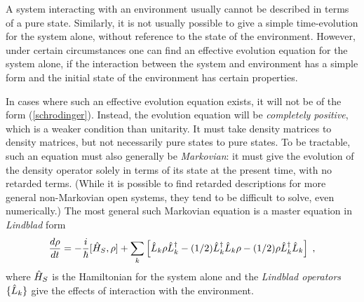 A system interacting with an environment usually cannot
be described in terms of a pure state. Similarly, it is not usually possible
to give a simple time-evolution for the system alone, without reference
to the state of the environment.  However, under certain
circumstances one can find an effective evolution equation
for the system alone, if the interaction between the system and
environment has a simple form and the initial state of the
environment has certain properties.

In cases where such an effective evolution equation exists,
it will not be of the form (\ref{schrodinger}).
Instead, the evolution equation will be {\it completely positive},
which is a weaker condition than unitarity.  It must
take density matrices to density matrices, but not necessarily pure states
to pure states.  To be tractable, such an equation must also generally be
{\it Markovian}:  it must give the evolution of the density operator
solely in terms of its state at the present time, with no retarded terms.
(While it is possible to find retarded descriptions for more general
non-Markovian open systems, they tend to be difficult to solve, even
numerically.)  The most general such Markovian equation \cite{Lindblad}
is a master equation in {\it Lindblad} form
\begin{equation}
{d\rho\over dt} = - {i\over\hbar}[{\hat H}_S,\rho] +
  \sum_k \left[ {\hat L}_k \rho {\hat L^\dagger}_k - (1/2) {\hat L^\dagger}_k{\hat L}_k\rho
  - (1/2)\rho{\hat L^\dagger}_k{\hat L}_k \right] \;,
\label{Lindblad}
\end{equation}
where ${\hat H}_S$ is the Hamiltonian for the system alone and the
{\it Lindblad operators} $\{{\hat L}_k\}$ give the effects of interaction
with the environment.

